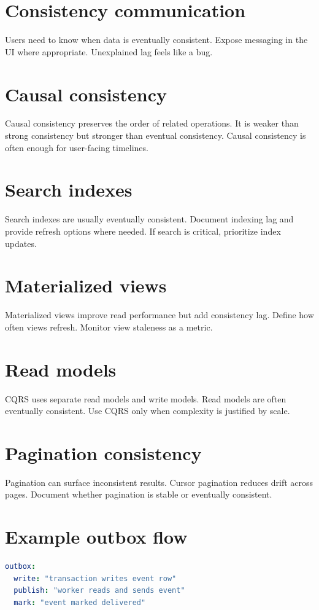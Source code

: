 \section{Consistency communication}
Users need to know when data is eventually consistent.
Expose messaging in the UI where appropriate.
Unexplained lag feels like a bug.

\section{Causal consistency}
Causal consistency preserves the order of related operations.
It is weaker than strong consistency but stronger than eventual consistency.
Causal consistency is often enough for user-facing timelines.

\section{Search indexes}
Search indexes are usually eventually consistent.
Document indexing lag and provide refresh options where needed.
If search is critical, prioritize index updates.

\section{Materialized views}
Materialized views improve read performance but add consistency lag.
Define how often views refresh.
Monitor view staleness as a metric.

\section{Read models}
CQRS uses separate read models and write models.
Read models are often eventually consistent.
Use CQRS only when complexity is justified by scale.

\section{Pagination consistency}
Pagination can surface inconsistent results.
Cursor pagination reduces drift across pages.
Document whether pagination is stable or eventually consistent.

\section{Example outbox flow}
\begin{lstlisting}[language=YAML]
outbox:
  write: "transaction writes event row"
  publish: "worker reads and sends event"
  mark: "event marked delivered"
\end{lstlisting}

